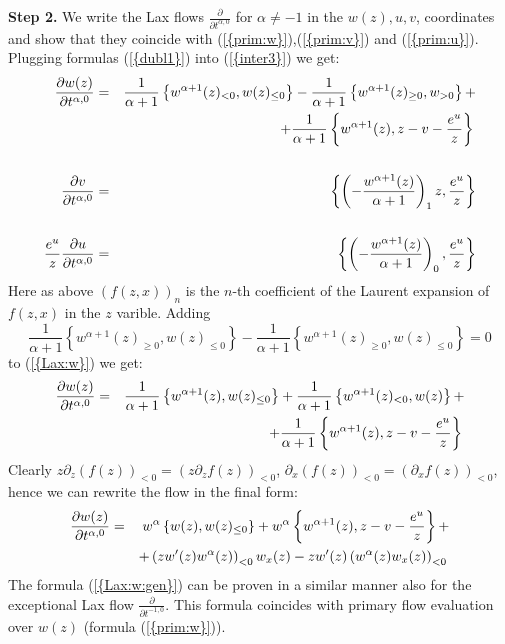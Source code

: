 \documentclass[numbook, envcountsame, envcountreset]{svjour3}
\begin{document}
{\bf Step 2.} We write the Lax flows $\frac{\partial}{{\partial} t^{\alpha,0}}$ for $\alpha\neq -1$ in the $w(z),u,v$, coordinates and show that they coincide with {(\ref{{prim:w}})},{(\ref{{prim:v}})} and {(\ref{{prim:u}})}. Plugging formulas {(\ref{{dubl1}})} into {(\ref{{inter3}})} we get:
\begin{eqnarray}
\frac{{\partial} w(z)}{{\partial} t^{\alpha,0}} &=&\frac1{\alpha+1} \left\{ w^{\alpha+1}(z)_{<0}, w(z)_{\leq 0} \right\}-
\frac1{\alpha+1} \left\{ w^{\alpha+1}(z)_{\geq 0}, w_{>0} \right\}+\label{Lax:w}\\
&&+\frac1{\alpha+1} \left\{ w^{\alpha+1}(z), z-v-\frac{e^u}z \right\}{\nonumber}\\
&&
{\nonumber}\\
\frac{{\partial} v}{{\partial} t^{\alpha,0}} &=& \left\{ \left(-\frac{w^{\alpha+1}(z)}{\alpha+1}\right)_1z, \frac{e^u}z \right\}\label{Lax:v}\\
&&
{\nonumber}\\
\frac{e^u}z\frac{{\partial} u}{{\partial} t^{\alpha,0}} &=& \left\{ \left(-\frac{w^{\alpha+1}(z)}{\alpha+1}\right)_0, \frac{e^u}z \right\}\label{Lax:u}
\end{eqnarray}
Here as above $(f(z,x))_n$ is the $n$-th coefficient of the Laurent expansion of $f(z,x)$ in the $z$ varible. Adding 
$$
\frac1{\alpha+1} \left\{ w^{\alpha+1}(z)_{\geq 0}, w(z)_{\leq 0} \right\}- \frac1{\alpha+1} \left\{ w^{\alpha+1}(z)_{\geq 0}, w(z)_{\leq 0} \right\}=0
$$ 
to {(\ref{{Lax:w}})} we get:
\begin{eqnarray}
\frac{{\partial} w(z)}{{\partial} t^{\alpha,0}} &=&\frac1{\alpha+1} \left\{ w^{\alpha+1}(z), w(z)_{\leq 0} \right\}+
\frac1{\alpha+1} \left\{ w^{\alpha+1}(z)_{<0}, w(z) \right\}+\\
&&+\frac1{\alpha+1} \left\{ w^{\alpha+1}(z), z-v-\frac{e^u}z \right\}{\nonumber}
\end{eqnarray}
Clearly $z{\partial}_z\left(f(z)\right)_{<0}=\left( z{\partial}_z f(z) \right)_{<0}$, ${\partial}_x\left(f(z)\right)_{<0}=\left( {\partial}_x f(z) \right)_{<0}$, hence we can rewrite the flow in the final form: 
\begin{eqnarray}
\frac{{\partial} w(z)}{{\partial} t^{\alpha,0}} &=& w^{\alpha}\left\{ w(z), w(z)_{\leq 0} \right\}+
w^{\alpha} \left\{ w^{\alpha+1}(z), z-v-\frac{e^u}z \right\}+\label{Lax:w:gen}\\ 
&&
+\left(z w'(z) w^{\alpha}(z)\right)_{<0}w_x(z) - z w'(z)\left( w^{\alpha}(z)w_x(z)\right)_{<0}{\nonumber}
\end{eqnarray}
The formula {(\ref{{Lax:w:gen}})} can be proven in a similar manner also for the exceptional Lax flow $\frac{\partial}{{\partial} t^{-1,0}}$. This formula coincides with primary flow evaluation over $w(z)$ (formula {(\ref{{prim:w}})}).   
\end{document}
